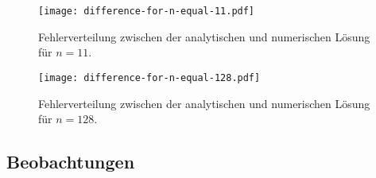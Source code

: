 \documentclass{scrartcl}
\begin{document}
\begin{figure}[H]\label{fig:difference-for-n-equal-11}
    \centering
    \texttt{[image: difference-for-n-equal-11.pdf]}
    \caption{
        Fehlerverteilung zwischen der analytischen und numerischen Lösung für
        \(n = 11\).
    }
\end{figure}

\begin{figure}[H]\label{fig:difference-for-n-equal-128}
    \centering
    \texttt{[image: difference-for-n-equal-128.pdf]}
    \caption{
        Fehlerverteilung zwischen der analytischen und numerischen Lösung für
        \(n = 128\).
    }
\end{figure}

\pagebreak

\subsection{Beobachtungen}
\end{document}
